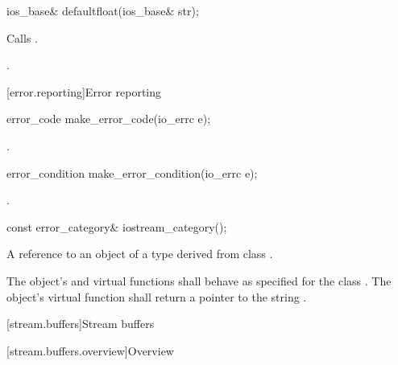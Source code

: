 %
\begin{itemdecl}
ios_base& defaultfloat(ios_base& str);
\end{itemdecl}

\begin{itemdescr}
\pnum
\effects
Calls .

\pnum
\returns {}.
\end{itemdescr}

[error.reporting]{Error reporting}

%
\begin{itemdecl}
error_code make_error_code(io_errc e);
\end{itemdecl}

\begin{itemdescr}
\pnum
\returns {}.
\end{itemdescr}

%
\begin{itemdecl}
error_condition make_error_condition(io_errc e);
\end{itemdecl}

\begin{itemdescr}
\pnum
\returns {}.
\end{itemdescr}

%
\begin{itemdecl}
const error_category& iostream_category();
\end{itemdecl}

\begin{itemdescr}
\pnum
\returns A reference to an object of a type derived from class
.

\pnum
The object's  and  virtual functions shall behave as specified for the class . The object's  virtual function shall return a pointer to the string .
\end{itemdescr}


[stream.buffers]{Stream buffers}

[stream.buffers.overview]{Overview}

%


